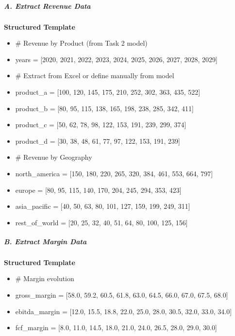 \documentclass[11pt]{article}
\begin{document}
\subparagraph{A. Extract Revenue Data}\mbox{}\par
\textbf{Structured Template}
\begin{itemize}[leftmargin=*,itemsep=2pt,topsep=2pt]
\item {} \# Revenue by Product (from Task 2 model)
\item {} years = [2020, 2021, 2022, 2023, 2024, 2025, 2026, 2027, 2028, 2029]
\item {} \# Extract from Excel or define manually from model
\item {} product\_\allowbreak{}a = [100, 120, 145, 175, 210, 252, 302, 363, 435, 522]
\item {} product\_\allowbreak{}b = [80, 95, 115, 138, 165, 198, 238, 285, 342, 411]
\item {} product\_\allowbreak{}c = [50, 62, 78, 98, 122, 153, 191, 239, 299, 374]
\item {} product\_\allowbreak{}d = [30, 38, 48, 61, 77, 97, 122, 153, 191, 239]
\item {} \# Revenue by Geography
\item {} north\_\allowbreak{}america = [150, 180, 220, 265, 320, 384, 461, 553, 664, 797]
\item {} europe = [80, 95, 115, 140, 170, 204, 245, 294, 353, 423]
\item {} asia\_\allowbreak{}pacific = [40, 50, 63, 80, 101, 127, 159, 199, 249, 311]
\item {} rest\_\allowbreak{}of\_\allowbreak{}world = [20, 25, 32, 40, 51, 64, 80, 100, 125, 156]
\end{itemize}

\subparagraph{B. Extract Margin Data}\mbox{}\par
\textbf{Structured Template}
\begin{itemize}[leftmargin=*,itemsep=2pt,topsep=2pt]
\item {} \# Margin evolution
\item {} gross\_\allowbreak{}margin = [58.0, 59.2, 60.5, 61.8, 63.0, 64.5, 66.0, 67.0, 67.5, 68.0]
\item {} ebitda\_\allowbreak{}margin = [12.0, 15.5, 18.8, 22.0, 25.0, 28.0, 30.5, 32.0, 33.0, 34.0]
\item {} fcf\_\allowbreak{}margin = [8.0, 11.0, 14.5, 18.0, 21.0, 24.0, 26.5, 28.0, 29.0, 30.0]
\end{itemize}
\end{document}
